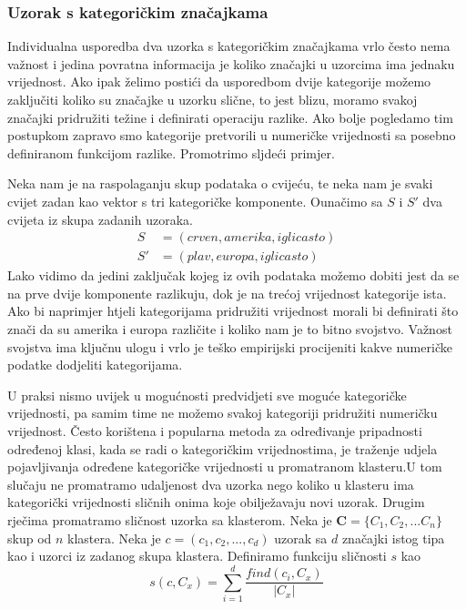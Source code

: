 \documentclass[a4paper,twoside,12pt]{memoir} %
\begin{document}
\subsubsection{Uzorak s kategoričkim značajkama}
Individualna usporedba  dva uzorka s kategoričkim značajkama vrlo često nema važnost i jedina povratna informacija je koliko značajki u uzorcima ima jednaku vrijednost. Ako ipak želimo postići da usporedbom dvije kategorije možemo zaključiti koliko su značajke u uzorku slične, to jest blizu, moramo svakoj značajki pridružiti težine i definirati operaciju razlike. Ako bolje pogledamo tim postupkom zapravo smo kategorije pretvorili u numeričke vrijednosti sa posebno definiranom funkcijom razlike.
Promotrimo sljdeći primjer.
\begin{exa}
Neka nam je na raspolaganju skup podataka o cvijeću, te neka nam je svaki cvijet zadan kao vektor s tri kategoričke komponente. Ounačimo sa $S$ i $S'$
dva cvijeta iz skupa zadanih uzoraka.
\begin{align*}
 S &= (crven, amerika, iglicasto)\\
 S'& = (plav, europa, iglicasto)
\end{align*}
Lako vidimo da jedini zaključak kojeg iz ovih podataka možemo dobiti jest da se na prve dvije komponente razlikuju, dok je na trećoj vrijednost kategorije ista. Ako bi naprimjer htjeli kategorijama pridružiti vrijednost morali bi definirati što znači da su amerika i europa različite i koliko nam je to bitno svojstvo. Važnost svojstva ima ključnu ulogu i vrlo je teško empirijski procijeniti kakve numeričke podatke dodjeliti kategorijama.
\end{exa} 
U praksi nismo uvijek u mogućnosti predvidjeti sve moguće kategoričke vrijednosti, pa samim time ne možemo svakoj kategoriji pridružiti numeričku vrijednost. Često korištena i popularna metoda za određivanje pripadnosti određenoj klasi, kada se radi o kategoričkim vrijednostima, je traženje udjela pojavljivanja određene kategoričke vrijednosti u promatranom klasteru.U tom slučaju ne promatramo udaljenost dva uzorka nego koliko u klasteru ima kategorički vrijednosti sličnih onima koje obilježavaju novi uzorak.
Drugim rječima promatramo sličnost uzorka sa klasterom.
Neka je $\mathbf{C} = \{C_1,C_2,...C_n\}$ skup od $n$ klastera. Neka je $c = (c_1,c_2,...,c_d)$ uzorak sa $d$ značajki istog tipa kao i uzorci iz zadanog skupa klastera. Definiramo funkciju sličnosti $s$ kao
\begin{equation}
\label{equ:omjer_znacajki}
s(c,C_x) =  \sum_{i=1}^{d}\frac{ find(c_i,C_x)}{|C_x|}
\end{equation} 
\end{document}
